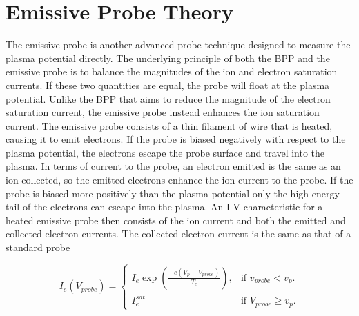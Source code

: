 %
%
%
%
%
%
%
%
%
%

\section{Emissive Probe Theory}
\label{sec:emissive}
The emissive probe is another advanced probe technique designed to measure the plasma potential directly. The underlying principle of both the BPP and the emissive probe is to balance the magnitudes of the ion and electron saturation currents. If these two quantities are equal, the probe will float at the plasma potential. Unlike the BPP that aims to reduce the magnitude of the electron saturation current, the emissive probe instead enhances the ion saturation current. The emissive probe consists of a thin filament of wire that is heated, causing it to emit electrons. If the probe is biased negatively with respect to the plasma potential, the electrons escape the probe surface and travel into the plasma. In terms of current to the probe, an electron emitted is the same as an ion collected, so the emitted electrons enhance the ion current to the probe. If the probe is biased more positively than the plasma potential only the high energy tail of the electrons can escape into the plasma. An I-V characteristic for a heated emissive probe then consists of the ion current and both the emitted and collected electron currents. The collected electron current is the same as that of a standard probe 



\begin{equation}
 I_e (V_{probe}) =    \begin{cases}
   I_e \exp \left (\frac{-e(V_p - V_{probe})}{T_e} \right), & \text{if $v_{probe} < v_p$}.\\
    I_e^{sat} & \text{if $V_{probe} \geq v_p$}.
  \end{cases}
\end{equation}


